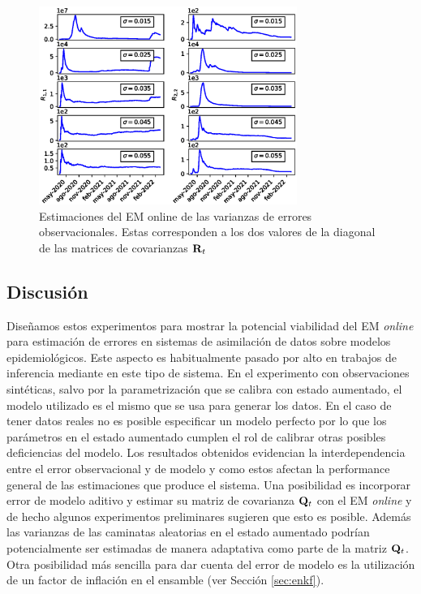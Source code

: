 \begin{figure}[h]
    \centering
    \includegraphics[width=0.75\textwidth]{figs/seird_online_em_aug_state_R_arg_data_sigmas.eps}
    \caption{Estimaciones del EM online de las varianzas de errores observacionales. Estas corresponden a los dos valores de la diagonal de las matrices de covarianzas $\mathbf{R}_t$}
    \label{fig:seird_R_arg_data}
\end{figure}

\subsection{Discusión}

Diseñamos estos experimentos para mostrar la potencial viabilidad del EM \textit{online} para estimación de errores en sistemas de asimilación de datos sobre modelos epidemiológicos. Este aspecto es habitualmente pasado por alto en trabajos de inferencia mediante en este tipo de sistema. En el experimento con observaciones sintéticas, salvo por la parametrización que se calibra con estado aumentado, el modelo utilizado es el mismo que se usa para generar los datos. En el caso de tener datos reales no es posible especificar un modelo perfecto por lo que los parámetros en el estado aumentado cumplen el rol de calibrar otras posibles deficiencias del modelo. Los resultados obtenidos evidencian la interdependencia entre el error observacional y de modelo y como estos afectan la performance general de las estimaciones que produce el sistema. Una posibilidad es incorporar error de modelo aditivo y estimar su matriz de covarianza $\mathbf{Q}_t$ con el EM \textit{online} y de hecho algunos experimentos preliminares sugieren que esto es posible. Además las varianzas de las caminatas aleatorias en el estado aumentado podrían potencialmente ser estimadas de manera adaptativa como parte de la matriz $\mathbf{Q}_t$. Otra posibilidad más sencilla para dar cuenta del error de modelo es la utilización de un factor de inflación en el ensamble (ver Sección \ref{sec:enkf}).
